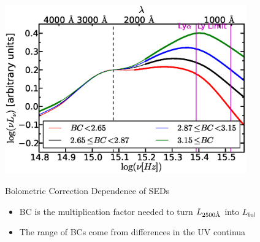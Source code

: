 \documentclass[landscape,9pt]{beamer}
\begin{document}
\begin{frame}
	\begin{center}
		\includegraphics[width=0.78\textwidth]{../images/SEDs/f13d}
	\end{center}
	\vspace{-.4cm}
	\begin{block}{Bolometric Correction Dependence of SEDs}
		\begin{itemize}
			\item BC is the multiplication factor needed to turn $L_{2500\textup{\AA}}$ into $L_{bol}$
			\item The range of BCs come from differences in the UV continua
		\end{itemize}
	\end{block}
\end{frame}
\end{document}
